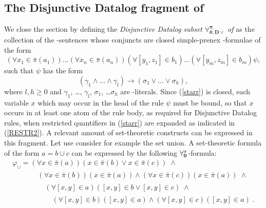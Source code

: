 \documentclass[a4paper]{llncs}
\newcommand{\ForallpizeroDisjDatalog}{\ensuremath{\mathbf{\forall_{0,D\vee}^{\pi}}}\xspace}
\newcommand{\pairin}[3]{\left[#1,#2\right] \in #3}
\newcommand{\nonpairin}[2]{#1 \in \bar{\pi}(#2)}
\begin{document}
\subsection{The Disjunctive Datalog fragment of \Forallpizero}\label{DISJFORALL}
We close the section by defining the \emph{Disjunctive Datalog subset}
$\ForallpizeroDisjDatalog$\emph{ of }\Forallpizero as the collection
of the \Forallpizero-sentences whose conjuncts are
closed simple-prenex \Forallpizero-formulae
of the form
\begin{equation}\label{starr}
  (\forall \nonpairin{x_1}{a_1})\ldots(\forall 
\nonpairin{x_n}{a_n})(\forall \pairin{y_1}{z_1}{b_1})\ldots(\forall 
\pairin{y_m}{z_m}{b_m})\psi,
\end{equation}
such that $\psi$ has the form
\[
   \left(\gamma_1 \wedge \ldots \wedge \gamma_l\right) \rightarrow
   \left(\sigma_1 \vee \ldots \vee \sigma_h\right) ,
\]
where $l,h \geq 0$ and $\gamma_1$, \ldots, $\gamma_l$, $\sigma_1$,
\ldots $\sigma_h$ are \Forallpizero-literals.  Since (\ref{starr}) is
closed, each variable $x$ which may occur in the head of the rule
$\psi$ must be bound, so that $x$ occurs in at least one atom of the
rule body, as required for Disjunctive Datalog rules, when restricted
quantifiers in (\ref{starr}) are expanded as indicated in
(\ref{RESTR2}). A relevant amount of set-theoretic constructs can be
expressed in this fragment. 
Let use consider for example the set union.
A set-theoretic formula of the form $a=b \cup c$ can be expressed by
the following $\mathbf{\forall_{0}^{\pi}}$-formula: 
\[
\begin{array}{l}
\varphi_{\cup} = \left(\forall \nonpairin{x}{a}\right)\left(\nonpairin{x}{b}
\vee \nonpairin{x}{c}\right) \; \wedge \\
\phantom{\varphi_{\cup} = }\quad  \left(\forall
\nonpairin{x}{b}\right)\left(\nonpairin{x}{a}\right) \wedge \left(\forall
\nonpairin{x}{c}\right)\left(\nonpairin{x}{a}\right) \; \wedge\\
\phantom{\varphi_{\cup} = } \quad\quad\left(\forall
\pairin{x}{y}{a}\right)\left(\pairin{x}{y}{b} \vee \pairin{x}{y}{c}\right)
\; \wedge \\
\phantom{\varphi_{\cup} = }\quad\quad\quad  \left(\forall
\pairin{x}{y}{b}\right)\left(\pairin{x}{y}{a}\right) \wedge \left(\forall
\pairin{x}{y}{c}\right)\left(\pairin{x}{y}{a}\right) \; .
\end{array}
\]
\end{document}
